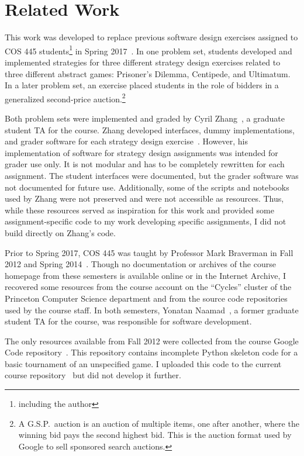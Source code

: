 \documentclass[pageno]{jpaper}
\begin{document}
\section*{Related Work}
This work was developed to replace previous software design exercises assigned to COS 445 students\footnote{including the author} in Spring 2017~\cite{cos445sp17}.
In one problem set, students developed and implemented strategies for three different strategy design exercises related to three different abstract games: Prisoner's Dilemma, Centipede, and Ultimatum.
In a later problem set, an exercise placed students in the role of bidders in a generalized second-price auction.\footnote{A G.S.P.\ auction is an auction of multiple items, one after another, where the winning bid pays the second highest bid. This is the auction format used by Google to sell sponsored search auctions.}

Both problem sets were implemented and graded by Cyril Zhang~\cite{cyrilzhang}, a graduate student TA for the course.
Zhang developed interfaces, dummy implementations, and grader software for each strategy design exercise~\cite{s17}.
However, his implementation of software for strategy design assignments was intended for grader use only.
It is not modular and has to be completely rewritten for each assignment.
The student interfaces were documented, but the grader software was not documented for future use.
Additionally, some of the scripts and notebooks used by Zhang were not preserved and were not accessible as resources.
Thus, while these resources served as inspiration for this work and provided some assignment-specific code to my work developing specific assignments, I did not build directly on Zhang's code.

Prior to Spring 2017, COS 445 was taught by Professor Mark Braverman in Fall 2012 and Spring 2014~\cite{coursehistory}.
Though no documentation or archives of the course homepage from these semesters is available online or in the Internet Archive, I recovered some resources from the course account on the ``Cycles'' cluster of the Princeton Computer Science department and from the source code repositories used by the course staff.
In both semesters, Yonatan Naamad~\cite{ynaamad}, a former graduate student TA for the course, was responsible for software development.

The only resources available from Fall 2012 were collected from the course Google Code repository~\cite{googlecode}.
This repository contains incomplete Python skeleton code for a basic tournament of an unspecified game.
I uploaded this code to the current course repository~\cite{f12} but did not develop it further.
\end{document}
